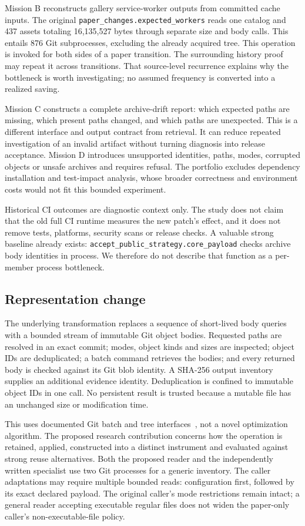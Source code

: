 \documentclass[11pt,a4paper]{article}
\newcommand{\code}[1]{\texttt{\small #1}}
\begin{document}
Mission B reconstructs gallery service-worker outputs from committed cache inputs. The original \code{paper\_changes.expected\_workers} reads one catalog and 437 assets totaling 16,135,527 bytes through separate size and body calls. This entails 876 Git subprocesses, excluding the already acquired tree. This operation is invoked for both sides of a paper transition. The surrounding history proof may repeat it across transitions. That source-level recurrence explains why the bottleneck is worth investigating; no assumed frequency is converted into a realized saving.

Mission C constructs a complete archive-drift report: which expected paths are missing, which present paths changed, and which paths are unexpected. This is a different interface and output contract from retrieval. It can reduce repeated investigation of an invalid artifact without turning diagnosis into release acceptance. Mission D introduces unsupported identities, paths, modes, corrupted objects or unsafe archives and requires refusal. The portfolio excludes dependency installation and test-impact analysis, whose broader correctness and environment costs would not fit this bounded experiment.

Historical CI outcomes are diagnostic context only. The study does not claim that the old full CI runtime measures the new patch's effect, and it does not remove tests, platforms, security scans or release checks. A valuable strong baseline already exists: \code{accept\_public\_strategy.core\_payload} checks archive body identities in process. We therefore do not describe that function as a per-member process bottleneck.

\subsection{Representation change}

The underlying transformation replaces a sequence of short-lived body queries with a bounded stream of immutable Git object bodies. Requested paths are resolved in an exact commit; modes, object kinds and sizes are inspected; object IDs are deduplicated; a batch command retrieves the bodies; and every returned body is checked against its Git blob identity. A SHA-256 output inventory supplies an additional evidence identity. Deduplication is confined to immutable object IDs in one call. No persistent result is trusted because a mutable file has an unchanged size or modification time.

This uses documented Git batch and tree interfaces~\cite{git_cat_file,git_ls_tree}, not a novel optimization algorithm. The proposed research contribution concerns how the operation is retained, applied, constructed into a distinct instrument and evaluated against strong reuse alternatives. Both the proposed reader and the independently written specialist use two Git processes for a generic inventory. The caller adaptations may require multiple bounded reads: configuration first, followed by its exact declared payload. The original caller's mode restrictions remain intact; a general reader accepting executable regular files does not widen the paper-only caller's non-executable-file policy.
\end{document}
